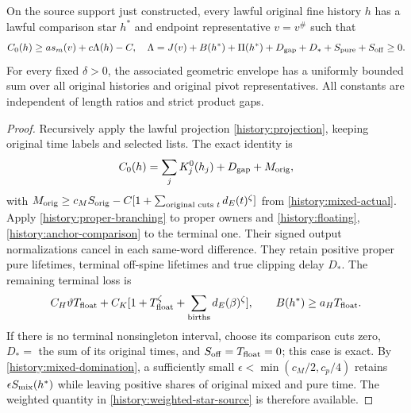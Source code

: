 \begin{proposition}
\label{history:source}
On the source support just constructed, every lawful original fine
history $h$ has a lawful comparison star $h^*$ and endpoint
representative $v=v^\#$ such that
\begin{equation}
 C_0(h)\ge as_m(v)+c\Lambda(h)-C,
 \quad
 \Lambda=J(v)+B(h^*)+\Pi(h^*)+D_{\rm gap}+D_*+
                                   S_{\rm pure}+S_{\rm off}\ge0.
 \label{history:source-geometry}
\end{equation}
For every fixed $\delta>0$, the associated geometric envelope has a
uniformly bounded sum over all original histories and original pivot
representatives. All constants are independent of length ratios and
strict product gaps.
\end{proposition}
\begin{proof}
Recursively apply the lawful projection \eqref{history:projection},
keeping original time labels and selected lists. The exact identity is
\[
 C_0(h)=\sum_jK_j^0(h_j)+D_{\rm gap}+M_{\rm orig},
\]
with $M_{\rm orig}\ge c_MS_{\rm orig}
-C[1+\sum_{\text{original cuts }t}d_E(t)^\zeta]$ from
\eqref{history:mixed-actual}. Apply
\eqref{history:proper-branching} to proper owners and
\eqref{history:floating}, \eqref{history:anchor-comparison} to the
terminal one. Their signed output normalizations cancel in each
same-word difference. They retain positive proper pure lifetimes,
terminal off-spine lifetimes and true clipping delay $D_*$.
The remaining terminal loss is
\[
 C_H\vartheta T_{\rm float}+
 C_K[1+T_{\rm float}^\zeta+\sum_{\rm births}d_E(\beta)^\zeta],
 \qquad B(h^*)\ge a_HT_{\rm float}.
\]
If there is no terminal nonsingleton interval, choose its comparison
cuts zero, $D_*=$ the sum of its original times, and
$S_{\rm off}=T_{\rm float}=0$; this case is exact.
By \eqref{history:mixed-domination}, a sufficiently small
$\epsilon<\min(c_M/2,c_p/4)$ retains
$\epsilon S_{\rm mix}(h^*)$ while leaving positive shares of
original mixed and pure time. The weighted quantity in
\eqref{history:weighted-star-source} is therefore available.


\end{proof}
